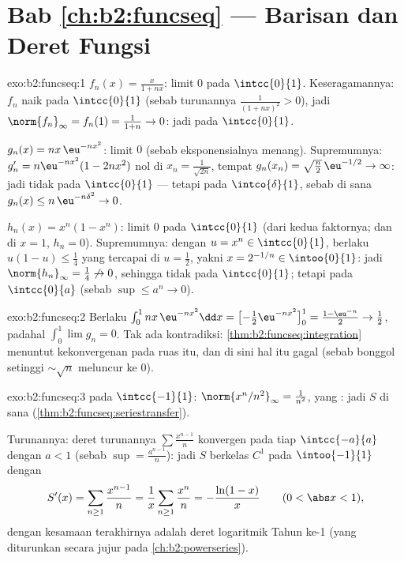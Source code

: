 \section*{Bab \ref{ch:b2:funcseq} --- Barisan dan Deret
Fungsi}

\begin{solution}{exo:b2:funcseq:1}
$f_n(x) = \frac{x}{1 + nx}$: limit  $0$ pada
$\intcc{0}{1}$. Keseragamannya: $f_n$ naik pada $\intcc{0}{1}$ (sebab
turunannya $\frac{1}{(1+nx)^2} > 0$), jadi $\norm{f_n}_\infty = f_n(1) =
\frac{1}{1+n} \to 0$: jadi \emph{} pada $\intcc{0}{1}$.

$g_n(x) = nx\,\eu^{-nx^2}$: limit  $0$ (sebab
eksponensialnya menang). Supremumnya: $g_n' = n\eu^{-nx^2}(1 - 2nx^2)$
nol di $x_n = \frac{1}{\sqrt{2n}}$, tempat $g_n(x_n) =
\sqrt{\frac n2}\,\eu^{-1/2} \to \infty$: jadi tidak  pada
$\intcc{0}{1}$ --- tetapi  pada $\intco{\delta}{1}$, sebab di
sana $g_n(x) \leq n\,\eu^{-n\delta^2} \to 0$.

$h_n(x) = x^n(1 - x^n)$: limit  $0$ pada
$\intcc{0}{1}$ (dari kedua faktornya; dan di $x = 1$, $h_n = 0$).
Supremumnya: dengan $u = x^n \in \intcc{0}{1}$, berlaku $u(1-u) \leq
\frac14$ yang tercapai di $u = \frac12$, yakni $x = 2^{-1/n} \in
\intoo{0}{1}$: jadi $\norm{h_n}_\infty = \frac14 \not\to 0$, sehingga
tidak  pada $\intcc{0}{1}$; tetapi  pada
$\intcc{0}{a}$ (sebab $\sup \leq a^n \to 0$).
\end{solution}

\begin{solution}{exo:b2:funcseq:2}
Berlaku $\int_0^1 nx\,\eu^{-nx^2}\dd x = \bigl[-\tfrac12
\eu^{-nx^2}\bigr]_0^1 = \frac{1 - \eu^{-n}}{2} \to \frac12$, padahal
$\int_0^1 \lim g_n = 0$. Tak ada kontradiksi:
\cref{thm:b2:funcseq:integration} menuntut kekonvergenan \emph{}
pada ruas itu, dan di sini hal itu gagal (sebab bonggol setinggi
$\sim\sqrt n$ meluncur ke $0$).
\end{solution}

\begin{solution}{exo:b2:funcseq:3}
 pada $\intcc{-1}{1}$: $\norm{x^n/n^2}_\infty =
\frac{1}{n^2}$, yang : jadi $S$  di sana
(\cref{thm:b2:funcseq:seriestransfer}).

Turunannya: deret turunannya $\sum \frac{x^{n-1}}{n}$ konvergen
 pada tiap $\intcc{-a}{a}$ dengan $a < 1$ (sebab $\sup =
\frac{a^{n-1}}{n}$): jadi $S$ berkelas $C^1$ pada $\intoo{-1}{1}$ dengan
\[
S'(x) = \sum_{n\geq1} \frac{x^{n-1}}{n} = \frac1x \sum_{n\geq1}
\frac{x^n}{n} = -\frac{\ln(1 - x)}{x}
\qquad (0 < \abs x < 1),
\]
dengan kesamaan terakhirnya adalah deret logaritmik Tahun ke-1 (yang
diturunkan secara jujur pada \cref{ch:b2:powerseries}).
\end{solution}

